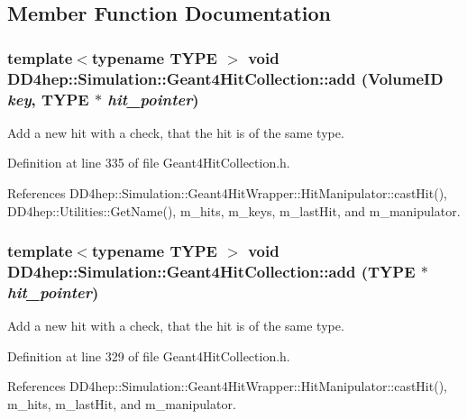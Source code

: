 \subsection{Member Function Documentation}
\hypertarget{class_d_d4hep_1_1_simulation_1_1_geant4_hit_collection_a881aca58ab7a524451faf1ae4159dfe4}{
\subsubsection[{add}]{\setlength{\rightskip}{0pt plus 5cm}template$<$typename TYPE $>$ void DD4hep::Simulation::Geant4HitCollection::add (VolumeID {\em key}, \/  TYPE $\ast$ {\em hit\_\-pointer})}}
\label{class_d_d4hep_1_1_simulation_1_1_geant4_hit_collection_a881aca58ab7a524451faf1ae4159dfe4}


Add a new hit with a check, that the hit is of the same type. 

Definition at line 335 of file Geant4HitCollection.h.

References DD4hep::Simulation::Geant4HitWrapper::HitManipulator::castHit(), DD4hep::Utilities::GetName(), m\_\-hits, m\_\-keys, m\_\-lastHit, and m\_\-manipulator.\hypertarget{class_d_d4hep_1_1_simulation_1_1_geant4_hit_collection_ac9eec55500c5cc2af9cd0892c8956b76}{
\subsubsection[{add}]{\setlength{\rightskip}{0pt plus 5cm}template$<$typename TYPE $>$ void DD4hep::Simulation::Geant4HitCollection::add (TYPE $\ast$ {\em hit\_\-pointer})}}
\label{class_d_d4hep_1_1_simulation_1_1_geant4_hit_collection_ac9eec55500c5cc2af9cd0892c8956b76}


Add a new hit with a check, that the hit is of the same type. 

Definition at line 329 of file Geant4HitCollection.h.

References DD4hep::Simulation::Geant4HitWrapper::HitManipulator::castHit(), m\_\-hits, m\_\-lastHit, and m\_\-manipulator.

